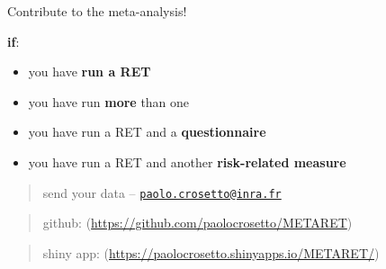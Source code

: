 \documentclass[
  ignorenonframetext,
]{beamer}
\providecommand{\tightlist}{%
  \setlength{\itemsep}{0pt}\setlength{\parskip}{0pt}}
\begin{document}
\begin{frame}{Contribute to the meta-analysis!}
\protect\hypertarget{contribute-to-the-meta-analysis}{}

\textbf{if}:

\begin{itemize}
\tightlist
\item
  you have \textbf{run a RET}
\item
  you have run \textbf{more} than one
\item
  you have run a RET and a \textbf{questionnaire}
\item
  you have run a RET and another \textbf{risk-related measure}
\end{itemize}

\begin{quote}
send your data --
\href{mailto:paolo.crosetto@inra.fr}{\nolinkurl{paolo.crosetto@inra.fr}}
\end{quote}

\begin{quote}
github: (\url{https://github.com/paolocrosetto/METARET})
\end{quote}

\begin{quote}
shiny app: (\url{https://paolocrosetto.shinyapps.io/METARET/})
\end{quote}

\end{frame}
\end{document}

